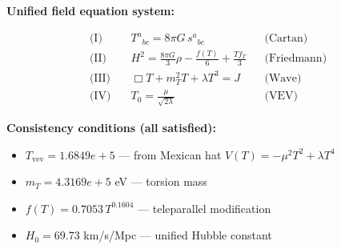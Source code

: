 
\textbf{Unified field equation system:}

\begin{align}
  \text{(I)} \quad & T^a{}_{bc} = 8\pi G \, s^a{}_{bc} && \text{(Cartan)} \\
  \text{(II)} \quad & H^2 = \frac{8\pi G}{3}\rho - \frac{f(T)}{6} + \frac{Tf_T}{3} && \text{(Friedmann)} \\
  \text{(III)} \quad & \Box T + m_T^2 T + \lambda T^3 = J && \text{(Wave)} \\
  \text{(IV)} \quad & T_0 = \frac{\mu}{\sqrt{2\lambda}} && \text{(VEV)}
\end{align}

\textbf{Consistency conditions (all satisfied):}
\begin{itemize}
  \item $T_{\text{vev}} = 1.6849e+5$ — from Mexican hat $V(T) = -\mu^2 T^2 + \lambda T^4$
  \item $m_T = 4.3169e+5$ eV — torsion mass
  \item $f(T) = 0.7053 \, T^{0.1604}$ — teleparallel modification
  \item $H_0 = 69.73$ km/s/Mpc — unified Hubble constant
\end{itemize}